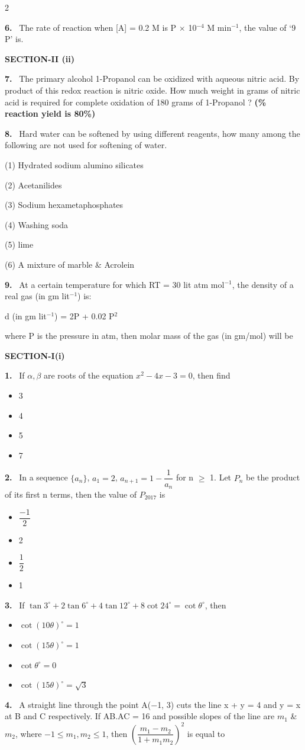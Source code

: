 \documentclass[10pt]{extarticle}
\newcommand{\partsec}[2]{\par\medskip\noindent{\large\bfseries PART-#1: #2}\par\smallskip}
\newcommand{\sect}[1]{\par\smallskip\noindent\textbf{#1}\par}
\newcommand{\qn}[1]{\par\smallskip\noindent\textbf{#1.}~}
\newenvironment{qoptions}{\begin{itemize}[leftmargin=1.8em,itemsep=1pt,topsep=2pt,label={}]}{\end{itemize}}
\newcommand{\opt}[2]{\item[(#1)] #2}
\begin{document}
\begin{multicols}{2}
\qn{6} The rate of reaction when [A] = 0.2 M is P $\times$ 10$^{-4}$ M min$^{-1}$, the value of `9 P' is.
\sect{SECTION-II (ii)}
\qn{7} The primary alcohol 1-Propanol can be oxidized with aqueous nitric acid. By product of this redox reaction is nitric oxide. How much weight in grams of nitric acid is required for complete oxidation of 180 grams of 1-Propanol ? \textbf{(\% reaction yield is 80\%)}
\qn{8} Hard water can be softened by using different reagents, how many among the following are not used for softening of water.\par
(1) Hydrated sodium alumino silicates\par
(2) Acetanilides\par
(3) Sodium hexametaphosphates\par
(4) Washing soda\par
(5) lime\par
(6) A mixture of marble \& Acrolein
\qn{9} At a certain temperature for which RT = 30 lit atm mol$^{-1}$, the density of a real gas (in gm lit$^{-1}$) is:\par
d (in gm lit$^{-1}$) = 2P + 0.02 P$^2$\par
where P is the pressure in atm, then molar mass of the gas (in gm/mol) will be
\partsec{3}{MATHEMATICS}
\sect{SECTION-I(i)}
\qn{1} If $\alpha,\beta$ are roots of the equation $x^2-4x-3=0$, then find\par
{}
\begin{qoptions}
\opt{A}{3}
\opt{B}{4}
\opt{C}{5}
\opt{D}{7}
\end{qoptions}
\qn{2} In a sequence $\{a_n\}$, $a_1=2$, $a_{n+1}=1-\dfrac1{a_n}$ for n $\geqslant$ 1. Let $P_n$ be the product of its first n terms, then the value of $P_{2017}$ is
\begin{qoptions}
\opt{A}{$\dfrac{-1}{2}$}
\opt{B}{2}
\opt{C}{$\dfrac12$}
\opt{D}{1}
\end{qoptions}
\qn{3} If $\tan3^\circ+2\tan6^\circ+4\tan12^\circ+8\cot24^\circ=\cot\theta^\circ$, then
\begin{qoptions}
\opt{A}{$\cot(10\theta)^\circ=1$}
\opt{B}{$\cot(15\theta)^\circ=1$}
\opt{C}{$\cot\theta^\circ=0$}
\opt{D}{$\cot(15\theta)^\circ=\sqrt3$}
\end{qoptions}
\qn{4} A straight line through the point A($-$1, 3) cuts the line x + y = 4 and y = x at B and C respectively. If AB.AC = 16 and possible slopes of the line are $m_1$ \& $m_2$, where $-1\leqslant m_1,m_2\leqslant1$, then $\left(\dfrac{m_1-m_2}{1+m_1m_2}\right)^2$ is equal to

\end{multicols}
\end{document}
